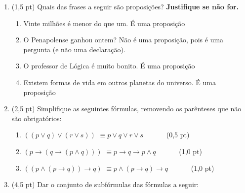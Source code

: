 \documentclass[12pt,a4paper,oneside]{article}
\begin{document}
\begin{enumerate}

	\item (1,5 pt) Quais das frases a seguir são proposições? {\bf Justifique se não for.}

		\begin{enumerate}
			\item Vinte milhões é menor do que um. {\color{verde} É uma proposição}
			\item O Penapolense ganhou ontem? {\color{red} Não é uma proposição, pois é uma pergunta (e não uma declaração).}
			\item O professor de Lógica é muito bonito. {\color{verde} É uma proposição}
			\item Existem formas de vida em outros planetas do universo. {\color{verde} É uma proposição}
		\end{enumerate}
		
	\item (2,5 pt) Simplifique as seguintes fórmulas, removendo os parênteses que não são obrigatórios:

		\begin{enumerate}
			\item $((p \vee q) \vee (r \vee s))$ {\color{verde} $\equiv p \vee q \vee r \vee s$} \ \ \ \ \ \ (0,5 pt) 
			\item $(p \rightarrow (q \rightarrow (p \wedge q)))$ {\color{verde} $\equiv p \rightarrow q \rightarrow p \wedge q$}  \ \ \ \ \ \ (1,0 pt) 
			\item $((p \wedge (p \rightarrow q)) \rightarrow q)$  {\color{verde} $\equiv p \wedge (p \rightarrow q) \rightarrow q$} \ \ \ \ \ \ (1,0 pt) 
		\end{enumerate}

	\item (4,5 pt) Dar o conjunto de subfórmulas das fórmulas a seguir:
	

\end{enumerate}
\end{document}
